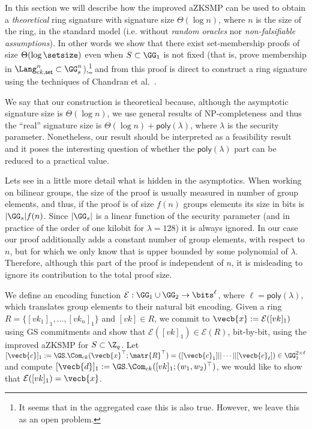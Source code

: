 In this section we will describe how the improved aZKSMP can be used to obtain a \emph{theoretical} ring signature with signature size \(\Theta(\log n)\), where \(n\) is the size of the ring, in the standard model (i.e. without \emph{random oracles} nor \emph{non-falsifiable  assumptions}). In other words we show that there exist set-membership proofs of size \(\Theta(\log \setsize )\) even when \(S\subset \GG_1\) is not fixed (that is, prove membership in $\Lang_{ck,\mathsf{set}}^n\subset\GG_s^n$),\footnote{It seems that in the aggregated case this is also true. However, we leave this as an open problem.} and from this proof is direct to construct a ring signature using the techniques of Chandran et al.~\cite{ICALP:ChaGroSah07}.

We say that our construction is theoretical because, although the asymptotic signature size is \(\Theta(\log n)\), we use general results of NP-completeness and thus the ``real'' signature size is \(\Theta(\log n)+\mathsf{poly}(\lambda)\), where \(\lambda\) is the security parameter. Nonetheless, our result should be interpreted as a feasibility result and it poses the interesting question of whether the \(\mathsf{poly}(\lambda)\) part can be reduced to a practical value.

Lets see in a little more detail what is hidden in the asymptotics. When working on bilinear groups, the size of the proof is usually measured in number of group elements, and thus, if the proof is of size $f(n)$ groups elements its size in bits is $|\GG_s|f(n)$. Since $|\GG_s|$ is a linear function of the security parameter (and in practice of the order of one kilobit for $\lambda=128$) it is always ignored. In our case our proof additionally adds a constant number of group elements, with respect to $n$, but for which we only know that is upper bounded by some polynomial of $\lambda$. Therefore, although this part of the proof is independent of $n$, it is misleading to ignore its contribution to the total proof size.
 
We define an encoding function \(\mathcal{E}:\GG_1\cup\GG_2\to\bits^\ell\), where \(\ell=\mathsf{poly}(\lambda)\), which translates group elements to their natural bit encoding. Given a ring \(R=\{[vk_1]_1,\ldots,[vk_n]_1\}\) and \([vk]\in R\), we commit to \(\vecb{x}:=\mathcal{E}([vk]_1)\) using GS commitments and show that \(\mathcal{E}([vk]_1)\in\mathcal{E}(R)\), bit-by-bit, using the improved aZKSMP for \(S\subset \Z_q\). Let \([\vecb{c}]_1:=\GS.\Com_{ck}(\vecb{x}^\top;\matr{R}^\top)=([\vecb{c}_1]||\cdots||[\vecb{c}_\ell])\in\GG_1^{2\times \ell}\) and compute \([\vecb{d}]_1:=\GS.\Com_{ck}([vk]_1;(w_1,w_2)^\top)\), we would like to show that \(\mathcal{E}([vk]_1)=\vecb{x}\).

